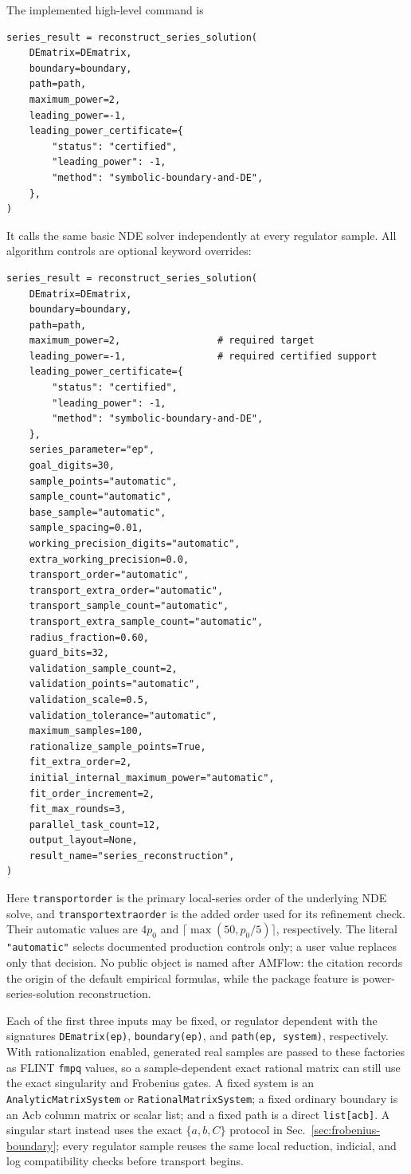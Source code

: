 \documentclass[11pt]{article}
\renewcommand{\_}{\origunderscore\allowbreak}
\begin{document}
The implemented high-level command is
\begin{verbatim}
series_result = reconstruct_series_solution(
    DEmatrix=DEmatrix,
    boundary=boundary,
    path=path,
    maximum_power=2,
    leading_power=-1,
    leading_power_certificate={
        "status": "certified",
        "leading_power": -1,
        "method": "symbolic-boundary-and-DE",
    },
)
\end{verbatim}
It calls the same basic NDE solver independently at every regulator sample.  All algorithm
controls are optional keyword overrides:
\begin{verbatim}
series_result = reconstruct_series_solution(
    DEmatrix=DEmatrix,
    boundary=boundary,
    path=path,
    maximum_power=2,                 # required target
    leading_power=-1,                # required certified support
    leading_power_certificate={
        "status": "certified",
        "leading_power": -1,
        "method": "symbolic-boundary-and-DE",
    },
    series_parameter="ep",
    goal_digits=30,
    sample_points="automatic",
    sample_count="automatic",
    base_sample="automatic",
    sample_spacing=0.01,
    working_precision_digits="automatic",
    extra_working_precision=0.0,
    transport_order="automatic",
    transport_extra_order="automatic",
    transport_sample_count="automatic",
    transport_extra_sample_count="automatic",
    radius_fraction=0.60,
    guard_bits=32,
    validation_sample_count=2,
    validation_points="automatic",
    validation_scale=0.5,
    validation_tolerance="automatic",
    maximum_samples=100,
    rationalize_sample_points=True,
    fit_extra_order=2,
    initial_internal_maximum_power="automatic",
    fit_order_increment=2,
    fit_max_rounds=3,
    parallel_task_count=12,
    output_layout=None,
    result_name="series_reconstruction",
)
\end{verbatim}
Here \texttt{transport\_order} is the primary local-series order of the underlying NDE solve,
and \texttt{transport\_extra\_order} is the added order used for its refinement check.  Their
automatic values are $4p_0$ and $\lceil\max(50,p_0/5)\rceil$, respectively.  The literal
\texttt{"automatic"} selects documented production controls only; a user value replaces
only that decision.  No public object is named after AMFlow: the citation records the origin
of the default empirical formulas, while the package feature is power-series-solution
reconstruction.

Each of the first three inputs may be fixed, or regulator dependent with the signatures
\texttt{DEmatrix(ep)}, \texttt{boundary(ep)}, and \texttt{path(ep, system)}, respectively.
With rationalization enabled, generated real samples are passed to these factories as FLINT
\texttt{fmpq} values, so a sample-dependent exact rational matrix can still use the exact
singularity and Frobenius gates.  A fixed system is an \texttt{AnalyticMatrixSystem} or
\texttt{RationalMatrixSystem}; a fixed ordinary boundary is an Acb column matrix or scalar
list; and a fixed path is a direct \texttt{list[acb]}.  A singular start instead uses the
exact $\{a,b,C\}$ protocol in Sec.~\ref{sec:frobenius-boundary}; every regulator sample
reuses the same local reduction, indicial, and log compatibility checks before transport
begins.
\end{document}

